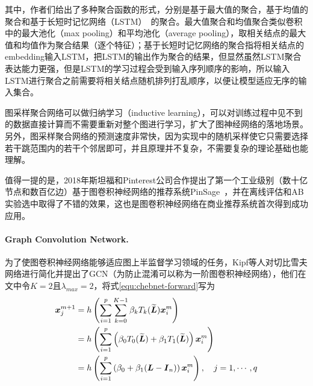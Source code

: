 \documentclass[final]{cvpr}
\newcommand{\mypara}[1]{\paragraph{#1.}}
\begin{document}
其中，作者们给出了多种聚合函数的形式，分别是基于最大值的聚合，基于均值的聚合和基于长短时记忆网络（LSTM）~\cite{hochreiter1997long}的聚合。最大值聚合和均值聚合类似卷积中的最大池化（max pooling）和平均池化（average pooling），取相关结点的最大值和均值作为聚合结果（逐个特征）；基于长短时记忆网络的聚合指将相关结点的embedding输入LSTM，把LSTM的输出作为聚合的结果，但显然虽然LSTM聚合表达能力更强，但是LSTM的学习过程会受到输入序列顺序的影响，所以输入LSTM进行聚合之前需要将相关结点随机排列打乱顺序，以便让模型适应无序的输入集合。

图采样聚合网络可以做归纳学习（inductive learning），可以对训练过程中见不到的数据直接计算而不需要重新对整个图进行学习，扩大了图神经网络的落地场景。另外，图采样聚合网络的预测速度非常快，因为实现中的随机采样使它只需要选择若干跳范围内的若干个邻居即可，并且原理并不复杂，不需要复杂的理论基础也能理解。

值得一提的是，2018年斯坦福和Pinterest公司合作提出了第一个工业级别（数十亿节点和数百亿边）基于图卷积神经网络的推荐系统PinSage~\cite{ying2018graph}，并在离线评估和AB实验选中取得了不错的效果，这也是图卷积神经网络在商业推荐系统首次得到成功应用。


\mypara{Graph Convolution Network} 
为了使图卷积神经网络能够适应图上半监督学习领域的任务，Kipf等人\cite{kipf2016semi}对切比雪夫网络进行简化并提出了GCN（为防止混淆可以称为一阶图卷积神经网络），他们在文中令$K=2$且$\lambda_{max}=2$，将式\ref{equ:chebnet-forward}写为
\begin{align}
    \boldsymbol{x}_j^{m+1}
    &= 
    h \left(
        \sum_{i=1}^{p}
        \sum_{k=0}^{K-1} \beta_k
        T_k ( \widetilde{\boldsymbol{L}} )
        \boldsymbol{x}_i^{m}
    \right) \notag \\
    &= 
    h \left(
        \sum_{i=1}^{p}
        \left(
        \beta_0 T_0 ( \widetilde{\boldsymbol{L}} )+
        \beta_1 T_1 ( \widetilde{\boldsymbol{L}} )
        \right) \boldsymbol{x}_i^{m}
    \right) \notag \\
    &= 
    h \left(
        \sum_{i=1}^{p}
        \left(
        \beta_0 +
        \beta_1 ( \boldsymbol{L}-\boldsymbol{I}_n )
        \right) \boldsymbol{x}_i^{m}
    \right)
    ,\quad j=1,\cdots,q  \label{equ:gcn-forward}
\end{align}
\end{document}
